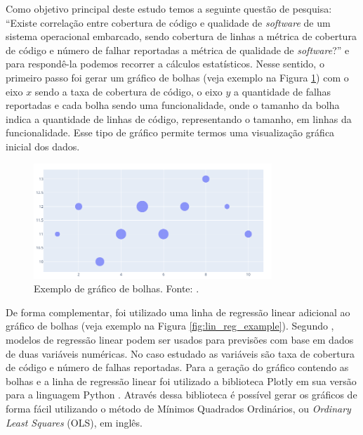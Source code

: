 \documentclass[11.5pt]{article}
\begin{document}
Como objetivo principal deste estudo temos a seguinte questão de pesquisa:
``Existe correlação entre cobertura de código e qualidade de \textit{software} de um sistema
operacional embarcado, sendo cobertura de linhas a métrica de cobertura de código e número de falhar
reportadas a métrica de qualidade de \textit{software}?'' e para respondê-la podemos recorrer a
cálculos estatísticos.
Nesse sentido, o primeiro passo foi gerar um gráfico de bolhas (veja exemplo na
Figura \ref{fig:bubble_example}) com o eixo $x$ sendo a taxa de cobertura de código, o eixo $y$ a
quantidade de falhas reportadas e cada bolha sendo uma funcionalidade, onde o tamanho da bolha
indica a quantidade de linhas de código, representando o tamanho, em linhas da funcionalidade.
Esse tipo de gráfico permite termos uma visualização gráfica inicial dos dados.

\begin{figure}[ht]
    \centering
    \includegraphics[width=0.8\textwidth]{bubble_example.png}
    \caption{Exemplo de gráfico de bolhas. Fonte: \cite{plotly}.}
    \label{fig:bubble_example}
\end{figure}

De forma complementar, foi utilizado uma linha de regressão linear adicional ao gráfico de bolhas
(veja exemplo na Figura \ref{fig:lin_reg_example}).
Segundo \cite{openIntroStat}, modelos de regressão linear podem ser usados para previsões com base
em dados de duas variáveis numéricas.
No caso estudado as variáveis são taxa de cobertura de código e número de falhas reportadas.
Para a geração do gráfico contendo as bolhas e a linha de regressão linear foi utilizado a
biblioteca Plotly em sua versão para a linguagem Python \cite{plotly}.
Através dessa biblioteca é possível gerar os gráficos de forma fácil utilizando o método de Mínimos
Quadrados Ordinários, ou \textit{Ordinary Least Squares} (OLS), em inglês.
\end{document}
